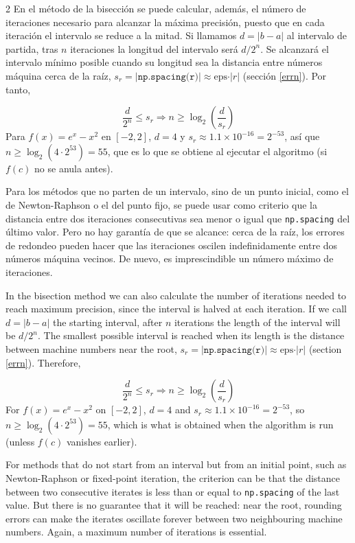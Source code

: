 \begin{paracol}{2}
En el método de la bisección se puede calcular, además, el número de iteraciones necesario para alcanzar la máxima precisión, puesto que en cada iteración el intervalo se reduce a la mitad. Si llamamos $d=\vert b-a \vert$ al intervalo de partida, tras $n$ iteraciones la longitud del intervalo será $d/2^{n}$. Se alcanzará el intervalo mínimo posible cuando su longitud sea la distancia entre números máquina cerca de la raíz, $s_r=\vert\texttt{np.spacing(r)}\vert\approx \text{eps}\cdot\vert r\vert$ (sección \ref{errn}). Por tanto,

\begin{equation*}
\frac{d}{2^{n}}\leq s_r\Rightarrow n \geq \log_{2}\left(\frac{d}{s_r}\right)
\end{equation*}
Para $f(x)=e^x-x^2$ en $[-2,2]$, $d=4$ y $s_r\approx1.1\times10^{-16}=2^{-53}$, así que $n\geq\log_2(4\cdot2^{53})=55$, que es lo que se obtiene al ejecutar el algoritmo (si $f(c)$ no se anula antes).

Para los métodos que no parten de un intervalo, sino de un punto inicial, como el de Newton-Raphson o el del punto fijo, se puede usar como criterio que la distancia entre dos iteraciones consecutivas sea menor o igual que \texttt{np.spacing} del último valor. Pero no hay garantía de que se alcance: cerca de la raíz, los errores de redondeo pueden hacer que las iteraciones oscilen indefinidamente entre dos números máquina vecinos. De nuevo, es imprescindible un número máximo de iteraciones.

\switchcolumn
In the bisection method we can also calculate the number of iterations needed to reach maximum precision, since the interval is halved at each iteration. If we call $d=\vert b-a \vert$ the starting interval, after $n$ iterations the length of the interval will be $d/2^{n}$. The smallest possible interval is reached when its length is the distance between machine numbers near the root, $s_r=\vert\texttt{np.spacing(r)}\vert\approx \text{eps}\cdot\vert r\vert$ (section \ref{errn}). Therefore,

\begin{equation*}
\frac{d}{2^{n}}\leq s_r\Rightarrow n \geq \log_{2}\left(\frac{d}{s_r}\right)
\end{equation*}
For $f(x)=e^x-x^2$ on $[-2,2]$, $d=4$ and $s_r\approx1.1\times10^{-16}=2^{-53}$, so $n\geq\log_2(4\cdot2^{53})=55$, which is what is obtained when the algorithm is run (unless $f(c)$ vanishes earlier).

For methods that do not start from an interval but from an initial point, such as Newton-Raphson or fixed-point iteration, the criterion can be that the distance between two consecutive iterates is less than or equal to \texttt{np.spacing} of the last value. But there is no guarantee that it will be reached: near the root, rounding errors can make the iterates oscillate forever between two neighbouring machine numbers. Again, a maximum number of iterations is essential.
\end{paracol}



